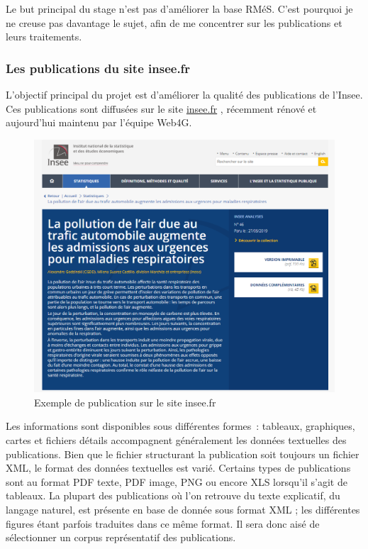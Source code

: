 Le but principal du stage n'est pas d'améliorer la base RMéS. C'est pourquoi je ne creuse pas davantage le sujet, afin de me concentrer sur les publications et leurs traitements.
\label{section 1.2.1 - Premières tentatives}

\subsubsection{Les publications du site insee.fr}

L'objectif principal du projet est d'améliorer la qualité des publications de l'Insee. Ces publications sont diffusées sur le site \href{https://insee.fr/fr/accueil}{insee.fr} \cite{insee.fr}, récemment rénové et aujourd'hui maintenu par l'équipe Web4G.
\newline

\begin{figure}[H]
    \centering
    \includegraphics[scale=0.52]{images/insee-fr-exemple.png}
    \caption{Exemple de publication sur le site insee.fr}
    \label{fig:insee.fr}
\end{figure}

Les informations sont disponibles sous différentes formes~: tableaux, graphiques, cartes et fichiers détails accompagnent généralement les données textuelles des publications. Bien que le fichier structurant la publication soit toujours un fichier XML, le format des données textuelles est varié. Certains types de publications sont au format PDF texte, PDF image, PNG ou encore XLS lorsqu'il s'agit de tableaux. La plupart des publications où l'on retrouve du texte explicatif, du langage naturel, est présente en base de donnée sous format XML ; les différentes figures étant parfois traduites dans ce même format. Il sera donc aisé de sélectionner un corpus représentatif des publications. 
\newline

